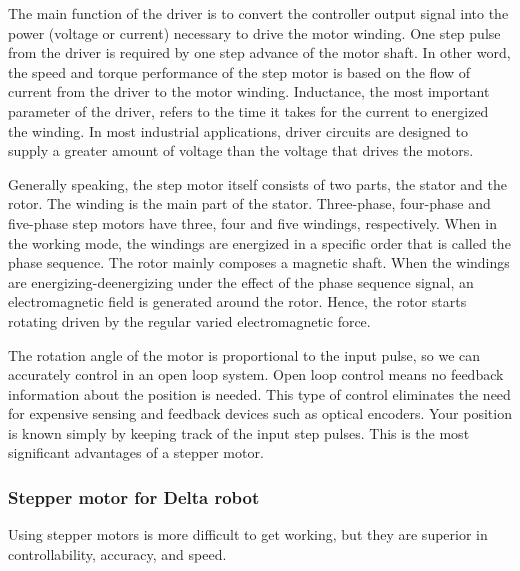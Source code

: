 The main function of the driver is to convert the controller output signal into the power (voltage or current) necessary to drive the motor winding. One step pulse from the driver is required by one step advance of the motor shaft. In other word, the speed and torque performance of the step motor is based on the flow of current from the driver to the motor winding. Inductance, the most important parameter of the driver, refers to the time it takes for the current to energized the winding. In most industrial applications, driver circuits are designed to supply a greater amount of voltage than the voltage that drives the motors.

Generally speaking, the step motor itself consists of two parts, the stator and the rotor. The winding is the main part of the stator. Three-phase, four-phase and five-phase step motors have three, four and five windings, respectively. When in the working mode, the windings are energized in a specific order that is called the phase sequence. The rotor mainly composes a magnetic shaft. When the windings are energizing-deenergizing under the effect of the phase sequence signal, an electromagnetic field is generated around the rotor. Hence, the rotor starts rotating driven by the regular varied electromagnetic force.

The rotation angle of the motor is proportional to the input pulse, so we can accurately control in an open loop system. Open loop control means no feedback information about the position is needed. This type of control eliminates the need for expensive sensing and feedback devices such as optical encoders. Your position is known simply by keeping track of the input step pulses. This is the most significant advantages of a stepper motor.
\subsubsection{Stepper motor for Delta robot}
Using stepper motors is more difficult to get working, but they are superior in controllability, accuracy, and speed.

